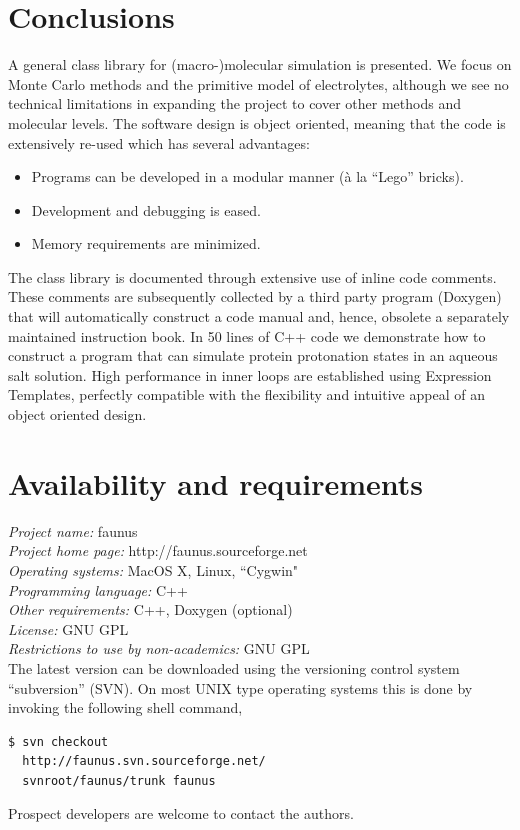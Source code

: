 \documentclass[10pt]{bmc_article}
\newenvironment{bmcformat}{\begin{raggedright}\baselineskip20pt\sloppy\setboolean{publ}{false}}{\end{raggedright}\baselineskip20pt\sloppy}
\begin{document}
\begin{bmcformat}
\section*{Conclusions}
A general class library for (macro-)molecular simulation is presented.
We focus on Monte Carlo methods and the primitive model of electrolytes, although we see no technical limitations in expanding the project to cover other methods and molecular levels.
The software design is object oriented, meaning that the code is extensively re-used which has several advantages:
\begin{itemize}
\item Programs can be developed in a modular manner (\`a la ``Lego'' bricks).
\item Development and debugging is eased.
\item Memory requirements are minimized.
\end{itemize}
The class library is documented through extensive use of inline code comments.
These comments are subsequently collected by a third party program (Doxygen) that will automatically construct a code manual and, hence, obsolete a separately maintained instruction book.
In 50 lines of C++ code we demonstrate how to construct a program that can simulate protein protonation states in an aqueous salt solution.
High performance in inner loops are established using Expression Templates, perfectly compatible with the flexibility and intuitive appeal of an object oriented design.

\section*{Availability and requirements}
\textsl{Project name:} faunus\\
\textsl{Project home page:} http://faunus.sourceforge.net\\
\textsl{Operating systems:} MacOS X, Linux, ``Cygwin"\\
\textsl{Programming language:} C++\\
\textsl{Other requirements:} C++, Doxygen (optional)\\
\textsl{License:} GNU GPL\\
\textsl{Restrictions to use by non-academics:} GNU GPL\\

The latest version can be downloaded using the versioning control system ``subversion'' (SVN).
On most UNIX type operating systems this is done by invoking the following shell command,
\begin{verbatim}
$ svn checkout
  http://faunus.svn.sourceforge.net/
  svnroot/faunus/trunk faunus
\end{verbatim}
Prospect developers are welcome to contact the authors.



\end{bmcformat}
\end{document}
